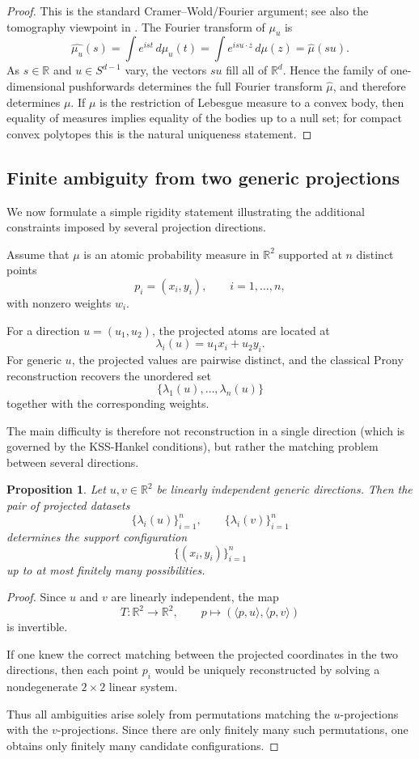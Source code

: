 \documentclass[reqno]{amsart}
\numberwithin{theorem}{section}
\newtheorem{proposition}[theorem]{Proposition}
\newcommand{\RR}{\mathbb{R}}
\begin{document}
\begin{proof}
This is the standard Cramer--Wold/Fourier argument; see also the tomography viewpoint in \cite{Gardner}. The Fourier transform of $\mu_u$ is
\[
\widehat{\mu_u}(s)=\int e^{ist}\,d\mu_u(t)=\int e^{is u\cdot z}\,d\mu(z)=\widehat\mu(su).
\]
As $s\in\RR$ and $u\in S^{d-1}$ vary, the vectors $su$ fill all of $\RR^d$.  Hence the family of one-dimensional pushforwards determines the full Fourier transform $\widehat\mu$, and therefore determines $\mu$.  If $\mu$ is the restriction of Lebesgue measure to a convex body, then equality of measures implies equality of the bodies up to a null set; for compact convex polytopes this is the natural uniqueness statement.
\end{proof}





\subsection{Finite ambiguity from two generic projections}

We now formulate a simple rigidity statement illustrating the additional
constraints imposed by several projection directions.

Assume that $\mu$ is an atomic probability measure in $\RR^2$ supported at
$n$ distinct points
\[
p_i=(x_i,y_i),
\qquad i=1,\dots,n,
\]
with nonzero weights $w_i$.

For a direction $u=(u_1,u_2)$, the projected atoms are located at
\[
\lambda_i(u)=u_1x_i+u_2y_i.
\]
For generic $u$, the projected values are pairwise distinct, and the
classical Prony reconstruction recovers the unordered set
\[
\{\lambda_1(u),\dots,\lambda_n(u)\}
\]
together with the corresponding weights.

The main difficulty is therefore not reconstruction in a single direction
(which is governed by the KSS-Hankel conditions), but rather the matching
problem between several directions.

\begin{proposition}\label{pr:finiteambiguity}
Let $u,v\in\RR^2$ be linearly independent generic directions.  Then the
pair of projected datasets
\[
\{\lambda_i(u)\}_{i=1}^n,
\qquad
\{\lambda_i(v)\}_{i=1}^n
\]
determines the support configuration
\[
\{(x_i,y_i)\}_{i=1}^n
\]
up to at most finitely many possibilities.
\end{proposition}

\begin{proof}
Since $u$ and $v$ are linearly independent, the map
\[
T:\RR^2\to\RR^2,
\qquad
p\mapsto (\langle p,u\rangle,\langle p,v\rangle)
\]
is invertible.

If one knew the correct matching between the projected coordinates in the
two directions, then each point $p_i$ would be uniquely reconstructed by
solving a nondegenerate $2\times2$ linear system.

Thus all ambiguities arise solely from permutations matching the
$u$-projections with the $v$-projections.  Since there are only finitely
many such permutations, one obtains only finitely many candidate
configurations.
\end{proof}
\end{document}
